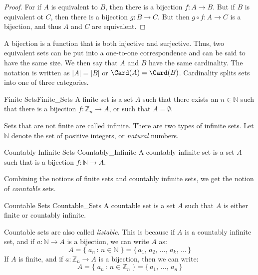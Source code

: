     \begin{proof}
        For if $A$ is equivalent to $B$, then there is a bijection
        $f:A\rightarrow{B}$. But if $B$ is equivalent ot $C$, then there is a
        bijection $g:B\rightarrow{C}$. But then $g\circ{f}:A\rightarrow{C}$ is a
        bijection, and thus $A$ and $C$ are equivalent.
    \end{proof}
    A bijection is a function that is both injective and surjective. Thus, two
    equivalent sets can be put into a one-to-one correspondence and can be said
    to have the same size. We then say that $A$ and $B$ have the same
    cardinality. The notation is written as $|A|=|B|$ or $\Card(A)=\Card(B)$.
    Cardinality splits sets into one of three categories.
    \begin{ldefinition}{Finite Sets}{Finite_Sets}
        A finite set is a set $A$ such that there exists
        an $n\in\mathbb{N}$ such that there is a
        bijection $f:\mathbb{Z}_{n}\rightarrow{A}$, or
        such that $A=\emptyset$.
    \end{ldefinition}
    Sets that are not finite are called infinite. There
    are two types of infinite sets. Let $\mathbb{N}$
    denote the set of positive integers, or
    \textit{natural} numbers.
    \begin{ldefinition}{Countably Infinite Sets}
          {Countably_Infinite}
        A countably infinite set is a set $A$ such that
        is a bijection $f:\mathbb{N}\rightarrow{A}$.
    \end{ldefinition}
    Combining the notions of finite sets and countably
    infinite sets, we get the notion of
    \textit{countable} sets.
    \begin{ldefinition}{Countable Sets}
          {Countable_Sets}
        A countable set is a set $A$ such that $A$ is
        either finite or countably infinite.
    \end{ldefinition}
    Countable sets are also called \textit{listable}.
    This is because if $A$ is a countably infinite set,
    and if $a:\mathbb{N}\rightarrow{A}$ is a bijection,
    we can write $A$ as:
    \begin{equation}
        A=\{\;a_{n}\,:\,n\in\mathbb{N}\;\}
        =\{\,a_{1},\,a_{2},\,\dots,\,a_{k},\,\dots\,\}
    \end{equation}
    If $A$ is finite, and if
    $a:\mathbb{Z}_{n}\rightarrow{A}$ is a
    bijection, then we can write:
    \begin{equation}
        A=\{\;a_{n}\,:\,n\in\mathbb{Z}_{n}\;\}
         =\{\,a_{1},\,\dots,\,a_{n}\,\}
    \end{equation}
